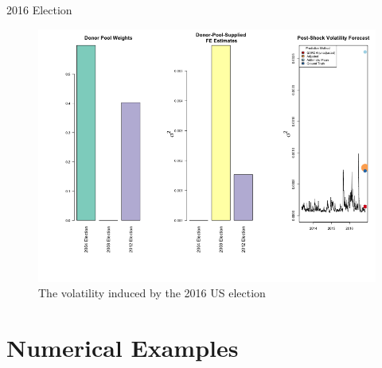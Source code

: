 \documentclass[9pt]{beamer}
\theoremstyle{definition}
\begin{document}
\begin{frame}{2016 Election}
    \begin{figure}[H]
        \begin{center}
          \includegraphics[scale=.34]{real_data_output_plots/savetime_SunMar172252462024_IYG_CL=F-^VIX-^IRX-^FVX-^TNX-^TYX_^VIX_2016-11-08-2004-11-02-2008-11-04-2012-11-06.png}
          \caption{The volatility induced by the 2016 US election}
          \label{fig:SVF_2016}
          \end{center}
        \end{figure}
\end{frame}

\section{Numerical Examples}
\end{document}
